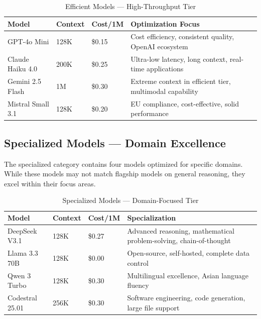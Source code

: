 \documentclass[12pt,a4paper,twoside]{report}
\begin{document}
\begin{table}[h]
\centering
\small
\begin{tabular}{@{}p{2.8cm}p{1.5cm}p{1.5cm}p{5.5cm}@{}}
\toprule
\textbf{Model} & \textbf{Context} & \textbf{Cost/1M} & \textbf{Optimization Focus} \\
\midrule
GPT-4o Mini & 128K & \$0.15 & Cost efficiency, consistent quality, OpenAI ecosystem \\
Claude Haiku 4.0 & 200K & \$0.25 & Ultra-low latency, long context, real-time applications \\
Gemini 2.5 Flash & 1M & \$0.30 & Extreme context in efficient tier, multimodal capability \\
Mistral Small 3.1 & 128K & \$0.20 & EU compliance, cost-effective, solid performance \\
\bottomrule
\end{tabular}
\caption{Efficient Models — High-Throughput Tier}
\label{tab:efficient-models}
\end{table}

\subsection{Specialized Models — Domain Excellence}

The specialized category contains four models optimized for specific domains. While these models may not match flagship models on general reasoning, they excel within their focus areas.

\begin{table}[h]
\centering
\small
\begin{tabular}{@{}p{2.8cm}p{1.5cm}p{1.5cm}p{5.5cm}@{}}
\toprule
\textbf{Model} & \textbf{Context} & \textbf{Cost/1M} & \textbf{Specialization} \\
\midrule
DeepSeek V3.1 & 128K & \$0.27 & Advanced reasoning, mathematical problem-solving, chain-of-thought \\
Llama 3.3 70B & 128K & \$0.00 & Open-source, self-hosted, complete data control \\
Qwen 3 Turbo & 128K & \$0.30 & Multilingual excellence, Asian language fluency \\
Codestral 25.01 & 256K & \$0.30 & Software engineering, code generation, large file support \\
\bottomrule
\end{tabular}
\caption{Specialized Models — Domain-Focused Tier}
\label{tab:specialized-models}
\end{table}
\end{document}
